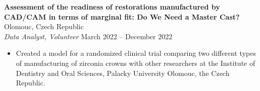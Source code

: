 \documentclass[a4paper,9pt]{extarticle}
\begin{document}
\noindent
\textbf{Assessment of the readiness of restorations manufactured by CAD/CAM in terms of marginal fit: Do We
Need a Master Cast? } \hfill Olomouc, Czech Republic\\ %
\textit{Data Analyst, Volunteer} \hfill March 2022 – December 2022 %
\begin{itemize}[topsep=0pt, partopsep=0pt, itemsep=0pt, parsep=0pt]
    \item Created a model for a randomized clinical trial comparing two different types of manufacturing of zirconia crowns with other researchers at the Institute of Dentistry and Oral Sciences, Palacky University Olomouc, the Czech Republic. %
\end{itemize}

\end{document}
